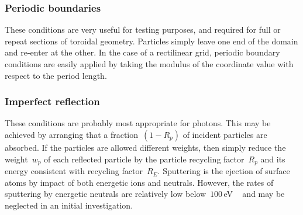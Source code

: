 \subsubsection{Periodic boundaries}\label{sec:bcsperio}
These conditions are very useful for testing purposes, and required for full
or repeat sections of toroidal geometry. Particles simply leave one end
of the domain and re-enter at the other. In the case of a rectilinear
grid, periodic boundary conditions are easily applied by 
taking the modulus of the coordinate value with respect to the period length.
\subsubsection{Imperfect reflection}\label{sec:bcsimperf}
These conditions are probably most appropriate for photons.
This may be achieved by arranging that a fraction~$(1-R_p)$ of incident
particles are absorbed.  If the particles are allowed different weights, then
simply reduce the weight~$w_p$ of each reflected particle by the particle recycling factor~$R_p$
and its energy consistent with recycling factor~$R_E$.
Sputtering is the ejection of surface atoms by impact of both
energetic ions and neutrals. However, the rates of sputtering by
energetic neutrals are relatively low below~$100$\,eV ~\cite[\S\,9.7]{wesson} and may be neglected
in an initial investigation.



%
